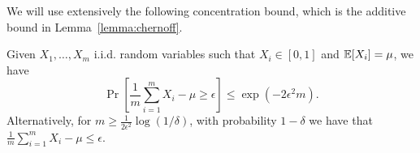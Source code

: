 



We will use extensively the following concentration bound, which is the additive bound in Lemma~\ref{lemma:chernoff}.

\begin{lemma}
\label{lem:hoeffding}
%
Given $X_{1},\dots,X_{m}$ i.i.d. random
variables such that $X_{i}\in[0,1]$ and $\mathbb{E}[X_{i}]=\mu$, we have
\[
\Pr\left[\frac{1}{m} \sum_{i=1}^{m}X_{i}-\mu \ge\epsilon\right] \le  \exp(-2\epsilon^{2}m).
\]
Alternatively, for $m\geq \frac{1}{2\epsilon^2}\log(1/\delta)$, with probability $1-\delta$ we have that $\frac{1}{m} \sum_{i=1}^{m}X_{i}-\mu \le\epsilon$.
\end{lemma}


